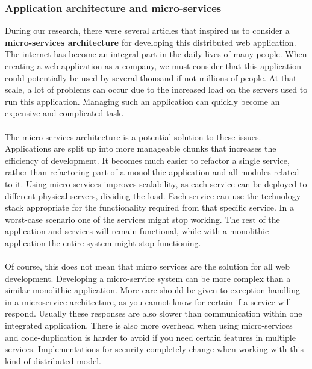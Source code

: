 \documentclass[12pt]{article}
\begin{document}
\begin{multicols}{2}
\subsubsection{Application architecture and micro-services}
During our research, there were several articles that inspired us to consider a \textbf{micro-services architecture} for developing this distributed web application. \cite{ApiGateway28:online} \cite{MicroservicesApiGateway87:online} \cite{MicroservicesFrameworks85:online} The internet has become an integral part in the daily lives of many people. When creating a web application as a company, we must consider that this application could potentially be used by several thousand if not millions of people. At that scale, a lot of problems can occur due to the increased load on the servers used to run this application. Managing such an application can quickly become an expensive and complicated task. 
\\\\
The micro-services architecture is a potential solution to these issues. Applications are split up into more manageable chunks that increases the efficiency of development. It becomes much easier to refactor a single service, rather than refactoring part of a monolithic application and all modules related to it. Using micro-services improves scalability, as each service can be deployed to different physical servers, dividing the load. Each service can use the technology stack appropriate for the functionality required from that specific service. In a worst-case scenario one of the services might stop working. The rest of the application and services will remain functional, while with a monolithic application the entire system might stop functioning. \cite{MicroservicesProandCons72:online}
\\\\
Of course, this does not mean that micro services are the solution for all web development. Developing a micro-service system can be more complex than a similar monolithic application. More care should be given to exception handling in a microservice architecture, as you cannot know for certain if a service will respond. Usually these responses are also slower than communication within one integrated application. There is also more overhead when using micro-services and code-duplication is harder to avoid if you need certain features in multiple services. Implementations for security completely change when working with this kind of distributed model. 
\\\\

\end{multicols}
\end{document}
